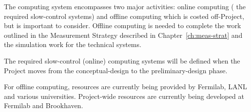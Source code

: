 The computing system encompasses two major activities: %
online computing (%
the required slow-control systems) and %
offline 
computing which is costed off-Project, but is important to consider.
Offline computing is needed to complete 
the work outlined in the Measurement Strategy described in Chapter~\ref{ch:meas-strat} and the simulation work %
for the technical systems.

The required slow-control (online) computing systems will be defined when the Project moves 
from the conceptual-design to the preliminary-design phase.

For offline computing, resources are currently being provided by Fermilab, 
LANL and various universities.  Project-wide resources are currently 
being developed at Fermilab and Brookhaven.
